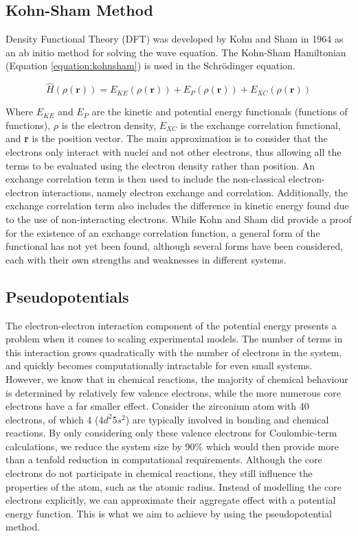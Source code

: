 \subsection{Kohn-Sham Method}

Density Functional Theory (DFT) was developed by Kohn and Sham in 1964 \cite{Kohn1965} as an ab initio method for solving the wave equation. The Kohn-Sham Hamiltonian (Equation \ref{equation:kohnsham}) is used in the Schr\"odinger equation.

\begin{equation}
\hat{H}(\rho(\textbf{r})) = E_{KE}(\rho(\textbf{r})) + E_{P}(\rho(\textbf{r})) + E_{XC}(\rho(\textbf{r}))
\label{equation:kohnsham}
\end{equation}

Where $E_{KE}$ and $E_{P}$ are the kinetic and potential energy functionals (functions of functions), $\rho$ is the electron density, $E_{XC}$ is the exchange correlation functional, and \textbf{r} is the position vector. The main approximation is to consider that the electrons only interact with nuclei and not other electrons, thus allowing all the terms to be evaluated using the electron density rather than position. An exchange correlation term is then used to include the non-classical electron-electron interactions, namely electron exchange and correlation. Additionally, the exchange correlation term also includes the difference in kinetic energy found due to the use of non-interacting electrons. While Kohn and Sham did provide a proof for the existence of an exchange correlation function, a general form of the functional has not yet been found, although several forms have been considered, each with their own strengths and weaknesses in different systems.

\subsection{Pseudopotentials}

The electron-electron interaction component of the potential energy presents a problem when it comes to scaling experimental models. The number of terms in this interaction grows quadratically with the number of electrons in the system, and quickly becomes computationally intractable for even small systems. However, we know that in chemical reactions, the majority of chemical behaviour is determined by relatively few valence electrons, while the more numerous core electrons have a far smaller effect. Consider the zirconium atom with 40 electrons, of which 4 (4$d^2$5$s^2$) are typically involved in bonding and chemical reactions. By only considering only these valence electrons for Coulombic-term calculations, we reduce the system size by 90\% which would then provide more than a tenfold reduction in computational requirements. Although the core electrons do not participate in chemical reactions, they still influence the properties of the atom, such as the atomic radius. Instead of modelling the core electrons explicitly, we can approximate their aggregate effect with a potential energy function. This is what we aim to achieve by using the pseudopotential method. 


